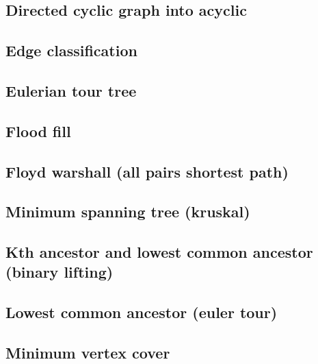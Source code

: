 \subsection{Directed cyclic graph into acyclic}
\raggedbottom
\hrulefill
\subsection{Edge classification}
\raggedbottom
\hrulefill
\subsection{Eulerian tour tree}
\raggedbottom
\hrulefill
\subsection{Flood fill}
\raggedbottom
\hrulefill
\subsection{Floyd warshall (all pairs shortest path)}
\raggedbottom
\hrulefill
\subsection{Minimum spanning tree (kruskal)}
\raggedbottom
\hrulefill
\subsection{Kth ancestor and lowest common ancestor (binary lifting)}
\raggedbottom
\hrulefill
\subsection{Lowest common ancestor (euler tour)}
\raggedbottom
\hrulefill
\subsection{Minimum vertex cover}
\raggedbottom
\hrulefill
